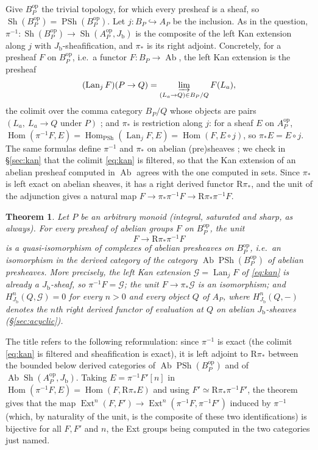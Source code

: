 \documentclass[11pt]{article}
\newcommand{\Hom}{\operatorname{Hom}}
\newcommand{\Sh}{\operatorname{Sh}}
\newcommand{\PSh}{\operatorname{PSh}}
\newcommand{\Ab}{\operatorname{Ab}}
\newcommand{\R}{\mathrm R}
\newcommand{\Jb}{J_{\mathrm b}}
\newcommand{\G}{\mathcal G}
\newcommand{\Lan}{\operatorname{Lan}}
\newtheorem{theorem}{Theorem}[section]
\theoremstyle{definition}
\theoremstyle{remark}
\begin{document}
Give \(B_P^{\mathrm{op}}\) the trivial topology, for which every presheaf is a
sheaf, so \(\Sh(B_P^{\mathrm{op}})=\PSh(B_P^{\mathrm{op}})\).  Let
\(j:B_P\hookrightarrow A_P\) be the inclusion.  As in the question,
\(\pi^{-1}:\Sh(B_P^{\mathrm{op}})\to\Sh(A_P^{\mathrm{op}},\Jb)\) is the
composite of the left Kan extension along \(j\) with \(\Jb\)-sheafification,
and \(\pi_*\) is its right adjoint.  Concretely, for a presheaf \(F\) on
\(B_P^{\mathrm{op}}\), i.e.\ a functor \(F:B_P\to\Ab\), the left Kan extension
is the presheaf
\begin{equation}
  (\Lan_jF)(P\to Q)
   =\varinjlim_{(L_a\to Q)\in B_P/Q}F(L_a),
  \label{eq:kan}
\end{equation}
the colimit over the comma category \(B_P/Q\) whose objects are pairs
\((L_a,\ L_a\to Q\text{ under }P)\) \cite[Tags 00VC, 00VE]{stacks}; and
\(\pi_*\) is restriction along \(j\): for a sheaf \(E\) on
\(A_P^{\mathrm{op}}\),
\(\Hom(\pi^{-1}F,E)=\Hom_{\PSh}(\Lan_jF,E)=\Hom(F,E\circ j)\), so
\(\pi_*E=E\circ j\).  The same formulas define \(\pi^{-1}\) and \(\pi_*\) on
abelian (pre)sheaves \cite[Tag 00VF]{stacks}; we check in \S\ref{sec:kan}
that the colimit
\eqref{eq:kan} is filtered, so that the Kan extension of an abelian presheaf
computed in \(\Ab\) agrees with the one computed in sets.  Since \(\pi_*\) is
left exact on abelian sheaves, it has a right derived functor \(\R\pi_*\),
and the unit of the adjunction gives a natural map
\(F\to\pi_*\pi^{-1}F\to\R\pi_*\pi^{-1}F\).

\begin{theorem}\label{thm:main}
Let \(P\) be an arbitrary monoid (integral, saturated and sharp, as
always).  For every presheaf of
abelian groups \(F\) on \(B_P^{\mathrm{op}}\), the unit
\[
             F\longrightarrow \R\pi_*\pi^{-1}F
\]
is a quasi-isomorphism of complexes of abelian presheaves on
\(B_P^{\mathrm{op}}\), i.e.\ an isomorphism in the derived category of
the category \(\Ab\PSh(B_P^{\mathrm{op}})\) of abelian presheaves.  More precisely, the left Kan extension
\(\G=\Lan_jF\) of \eqref{eq:kan} is already a \(\Jb\)-sheaf, so
\(\pi^{-1}F=\G\); the unit \(F\to\pi_*\G\) is an isomorphism; and
\(H^n_{\Jb}(Q,\G)=0\) for every \(n>0\) and every object \(Q\) of \(A_P\),
where \(H^n_{\Jb}(Q,-)\) denotes the \(n\)th right derived functor of
evaluation at \(Q\) on abelian \(\Jb\)-sheaves (\S\ref{sec:acyclic}).
\end{theorem}

The title refers to the following reformulation: since \(\pi^{-1}\) is
exact (the colimit \eqref{eq:kan} is filtered and sheafification is exact),
it is left adjoint to \(\R\pi_*\) between the bounded below derived
categories of \(\Ab\PSh(B_P^{\mathrm{op}})\) and of
\(\Ab\Sh(A_P^{\mathrm{op}},\Jb)\).  Taking \(E=\pi^{-1}F'[n]\) in
\(\Hom(\pi^{-1}F,E)=\Hom(F,\R\pi_*E)\) and using
\(F'\simeq\R\pi_*\pi^{-1}F'\), the theorem gives that the map
\(\operatorname{Ext}^n(F,F')\to\operatorname{Ext}^n(\pi^{-1}F,\pi^{-1}F')\)
induced by \(\pi^{-1}\) (which, by naturality of the unit, is the
composite of these two identifications) is bijective for all \(F,F'\) and
\(n\), the Ext groups being computed in the two categories just named.
\end{document}
